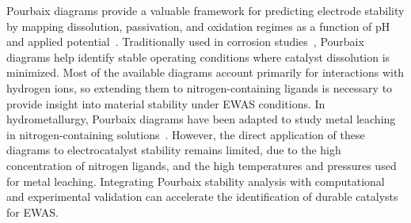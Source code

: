 \documentclass[journal=jacsat,manuscript=article]{achemso}
\begin{document}

Pourbaix diagrams provide a valuable framework for predicting electrode stability by mapping dissolution, passivation, and oxidation regimes as a function of pH and applied potential~\cite{PourbaixAtlasSolutions}. Traditionally used in corrosion studies~\cite{McCafferty2010ThermodynamicsDiagrams, Stack2005BridgingDiagrams,Pourbaix1973LecturesCorrosion}, Pourbaix diagrams help identify stable operating conditions where catalyst dissolution is minimized. Most of the available diagrams account primarily for interactions with hydrogen ions\cite{Huang2017ImprovedCompounds,Wang2020PredictingFunctional,Huang2015ElectrochemicalCalculations,Cao2020E-pHLaterite}, so extending them to nitrogen-containing ligands is necessary to provide insight into material stability under EWAS conditions. In hydrometallurgy, Pourbaix diagrams have been adapted to study metal leaching in nitrogen-containing solutions~\cite{Meng1996PrinciplesReview,NasuhaYahya2019ThermodynamicDiagram,Barragan2021LeachingOptimization,OConnor2018ElectrochemicalSolutions,Seke2006EffectSphalerite}. However, the direct application of these diagrams to electrocatalyst stability remains limited, due to the high concentration of nitrogen ligands, and the high temperatures and pressures used for metal leaching. Integrating Pourbaix stability analysis with computational and experimental validation can accelerate the identification of durable catalysts for EWAS.
\end{document}
